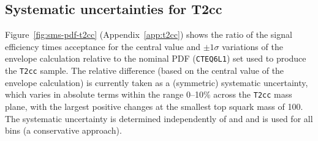 %
%

\subsection{Systematic uncertainties for T2cc\label{sec:sms-t2cc}}

Figure~\ref{fig:sms-pdf-t2cc} (Appendix~\ref{app:t2cc}) shows the
ratio of the signal efficiency times acceptance for the central value
and $\pm1\sigma$ variations of the envelope calculation relative to
the nominal PDF (\verb!CTEQ6L1!)  set used to produce the
\texttt{T2cc} sample. The relative difference (based on the central
value of the envelope calculation) is currently taken as a (symmetric)
systematic uncertainty, which varies in absolute terms within the
range 0--10\% across the \verb!T2cc! mass plane, with the largest
positive changes at the smallest top squark mass of 100\gev. The
systematic uncertainty is determined independently of \njet and \nb
and is used for all \scalht bins (a conservative approach). 

